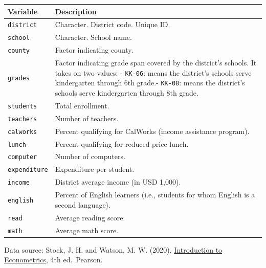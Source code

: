 \documentclass[
  12pt,
  a4paper,
]{scrbook}
\newcounter{none} %
\theoremstyle{plain}
\theoremstyle{definition}
\theoremstyle{remark}
\begin{document}
{\def\LTcaptype{none} %
\begin{longtable}[]{@{}
  >{\raggedright\arraybackslash}p{}
  >{\raggedright\arraybackslash}p{}@{}}
\toprule\noalign{}
\begin{minipage}[b]{\linewidth}\raggedright
Variable
\end{minipage} & \begin{minipage}[b]{\linewidth}\raggedright
Description
\end{minipage} \\
\midrule\noalign{}
\endhead
\bottomrule\noalign{}
\endlastfoot
\texttt{district} & Character. District code. Unique ID. \\
\texttt{school} & Character. School name. \\
\texttt{county} & Factor indicating county. \\
\texttt{grades} & Factor indicating grade span covered by the district's
schools. It takes on two values: - \texttt{KK-06}: means the district's
schools serve kindergarten through 6th grade.- \texttt{KK-08}: means the
district's schools serve kindergarten through 8th grade. \\
\texttt{students} & Total enrollment. \\
\texttt{teachers} & Number of teachers. \\
\texttt{calworks} & Percent qualifying for CalWorks (income assistance
program). \\
\texttt{lunch} & Percent qualifying for reduced-price lunch. \\
\texttt{computer} & Number of computers. \\
\texttt{expenditure} & Expenditure per student. \\
\texttt{income} & District average income (in USD 1,000). \\
\texttt{english} & Percent of English learners (i.e., students for whom
English is a second language). \\
\texttt{read} & Average reading score. \\
\texttt{math} & Average math score. \\
\end{longtable}
}

Data source: Stock, J. H. and Watson, M. W. (2020).
\href{https://www.sea-stat.com/wp-content/uploads/2020/08/James-H.-Stock-Mark-W.-Watson-Introduction-to-Econometrics-Global-Edition-Pearson-Education-Limited-2020.pdf}{Introduction
to Econometrics}, 4th ed.~Pearson.
\end{document}
